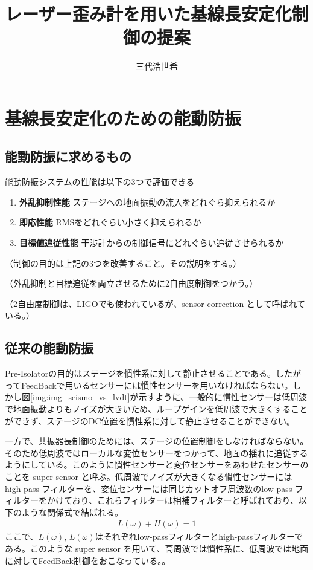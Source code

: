 \documentclass[a4paper,12pt]{jsarticle}
\title{レーザー歪み計を用いた基線長安定化制御の提案}
\author{三代浩世希}
\begin{document}
\setcounter{tocdepth}{3}
\maketitle
\abstract{}
\tableofcontents

\section{基線長安定化のための能動防振}
\subsection{能動防振に求めるもの}
能動防振システムの性能は以下の3つで評価できる
\begin{enumerate}
\item \textbf{外乱抑制性能} ステージへの地面振動の流入をどれぐら抑えられるか 
\item \textbf{即応性能} RMSをどれぐらい小さく抑えられるか
\item \textbf{目標値追従性能} 干渉計からの制御信号にどれぐらい追従させられるか
\end{enumerate}

（制御の目的は上記の3つを改善すること。その説明をする。）

（外乱抑制と目標追従を両立させるために2自由度制御をつかう。）

（2自由度制御は、LIGOでも使われているが、sensor correction として呼ばれている。）


\subsection{従来の能動防振}

Pre-Isolatorの目的はステージを慣性系に対して静止させることである。したがってFeedBackで用いるセンサーには慣性センサーを用いなければならない。しかし図\ref{img:img_seismo_vs_lvdt}が示すように、一般的に慣性センサーは低周波で地面振動よりもノイズが大きいため、ループゲインを低周波で大きくすることができず、ステージのDC位置を慣性系に対して静止させることができない。

一方で、共振器長制御のためには、ステージの位置制御をしなければならない。そのため低周波ではローカルな変位センサーをつかって、地面の揺れに追従するようにしている。このように慣性センサーと変位センサーをあわせたセンサーのことを super sensor と呼ぶ\cite{hua2005low}。低周波でノイズが大きくなる慣性センサーには high-pass フィルターを、変位センサーには同じカットオフ周波数のlow-pass フィルターをかけており、これらフィルターは相補フィルターと呼ばれており、以下のような関係式で結ばれる。
\begin{eqnarray}\label{eq:eq01}
  L(\omega) + H(\omega) = 1
\end{eqnarray}  
ここで、$L(\omega),\,L(\omega)$はそれぞれlow-passフィルターとhigh-passフィルターである。このような super sensor を用いて、高周波では慣性系に、低周波では地面に対してFeedBack制御をおこなっている。。
\end{document}
